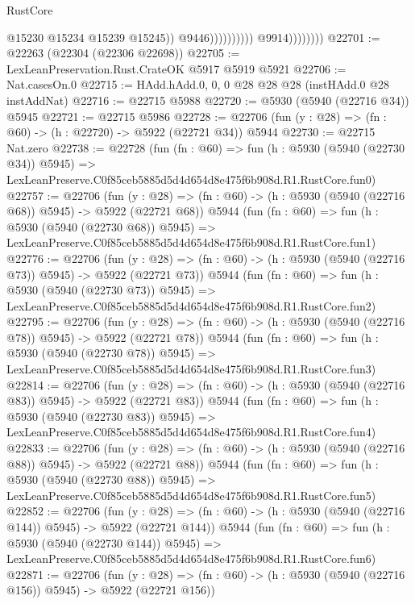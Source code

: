 \begin{lexlean}{RustCore}
\begin{coremodule}
                                            @15230
                                            @15234
                                            @15239
                                            @15245))
                                        @9446))))))))))
                    @9914))))))))
@22701 := @22263 (@22304 (@22306 @22698))
@22705 := LexLeanPreservation.Rust.CrateOK @5917 @5919 @5921
@22706 := Nat.casesOn.{0}
@22715 := HAdd.hAdd.{0, 0, 0} @28 @28 @28 (instHAdd.{0} @28 instAddNat)
@22716 := @22715 @5988
@22720 := @5930 (@5940 (@22716 @34)) @5945
@22721 := @22715 @5986
@22728 := @22706 (fun (y : @28) => (fn : @60) -> (h : @22720) -> @5922 (@22721 @34)) @5944
@22730 := @22715 Nat.zero
@22738 := @22728
    (fun (fn : @60) =>
    fun (h : @5930 (@5940 (@22730 @34)) @5945) =>
    LexLeanPreserve.C0f85ceb5885d5d4d654d8e475f6b908d.R1.RustCore.fun0)
@22757 := @22706
    (fun (y : @28) => (fn : @60) -> (h : @5930 (@5940 (@22716 @68)) @5945) -> @5922 (@22721 @68))
    @5944
    (fun (fn : @60) =>
    fun (h : @5930 (@5940 (@22730 @68)) @5945) =>
    LexLeanPreserve.C0f85ceb5885d5d4d654d8e475f6b908d.R1.RustCore.fun1)
@22776 := @22706
    (fun (y : @28) => (fn : @60) -> (h : @5930 (@5940 (@22716 @73)) @5945) -> @5922 (@22721 @73))
    @5944
    (fun (fn : @60) =>
    fun (h : @5930 (@5940 (@22730 @73)) @5945) =>
    LexLeanPreserve.C0f85ceb5885d5d4d654d8e475f6b908d.R1.RustCore.fun2)
@22795 := @22706
    (fun (y : @28) => (fn : @60) -> (h : @5930 (@5940 (@22716 @78)) @5945) -> @5922 (@22721 @78))
    @5944
    (fun (fn : @60) =>
    fun (h : @5930 (@5940 (@22730 @78)) @5945) =>
    LexLeanPreserve.C0f85ceb5885d5d4d654d8e475f6b908d.R1.RustCore.fun3)
@22814 := @22706
    (fun (y : @28) => (fn : @60) -> (h : @5930 (@5940 (@22716 @83)) @5945) -> @5922 (@22721 @83))
    @5944
    (fun (fn : @60) =>
    fun (h : @5930 (@5940 (@22730 @83)) @5945) =>
    LexLeanPreserve.C0f85ceb5885d5d4d654d8e475f6b908d.R1.RustCore.fun4)
@22833 := @22706
    (fun (y : @28) => (fn : @60) -> (h : @5930 (@5940 (@22716 @88)) @5945) -> @5922 (@22721 @88))
    @5944
    (fun (fn : @60) =>
    fun (h : @5930 (@5940 (@22730 @88)) @5945) =>
    LexLeanPreserve.C0f85ceb5885d5d4d654d8e475f6b908d.R1.RustCore.fun5)
@22852 := @22706
    (fun (y : @28) => (fn : @60) -> (h : @5930 (@5940 (@22716 @144)) @5945) -> @5922 (@22721 @144))
    @5944
    (fun (fn : @60) =>
    fun (h : @5930 (@5940 (@22730 @144)) @5945) =>
    LexLeanPreserve.C0f85ceb5885d5d4d654d8e475f6b908d.R1.RustCore.fun6)
@22871 := @22706
    (fun (y : @28) => (fn : @60) -> (h : @5930 (@5940 (@22716 @156)) @5945) -> @5922 (@22721 @156))

\end{coremodule}
\end{lexlean}

